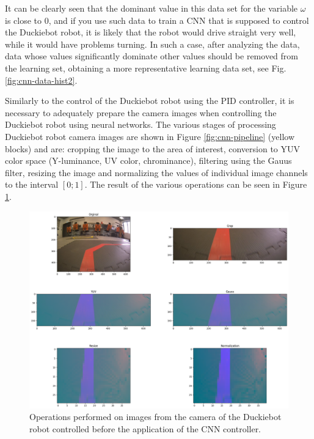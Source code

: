 \documentclass[conference]{IEEEtran}
\begin{document}
It can be clearly seen that the dominant value in this data set for the variable $\omega$ is close to $0$, and if you use such data to train a CNN that is supposed to control the Duckiebot robot, it is likely that the robot would drive straight very well, while it would have problems turning. In such a case, after analyzing the data, data whose values significantly dominate other values should be removed from the learning set, obtaining a more representative learning data set, see Fig. \ref{fig:cnn-data-hist2}.

Similarly to the control of the Duckiebot robot using the PID controller, it is necessary to adequately prepare the camera images when controlling the Duckiebot robot using neural networks. The various stages of processing Duckiebot robot camera images are shown in Figure \ref{fig:cnn-pipeline} (yellow blocks) and are: cropping the image to the area of interest, conversion to YUV color space (Y-luminance, UV color, chrominance), filtering using the Gauus filter, resizing the image and normalizing the values of individual image channels to the interval $[0;1]$. The result of the various operations can be seen in Figure \ref{fig:cnn-image-prepare}.

\begin{figure}[h]
    \centering
    \includegraphics[width=.95\columnwidth]{nn_prepare_image}
    \caption{Operations performed on images from the camera of the Duckiebot robot controlled before the application of the CNN controller.}
    \label{fig:cnn-image-prepare}
\end{figure}

\end{document}
